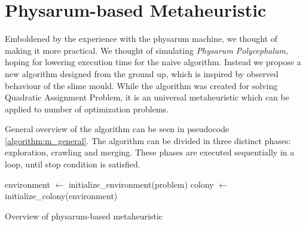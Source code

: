 \section{Physarum-based Metaheuristic}
\label{section:algorithm_metaheuristic}

Emboldened by the experience with the physarum machine, we thought of making it more practical. We thought of simulating \textit{Physarum Polycephalum}, hoping for lowering execution time for the naive algorithm. Instead we propose a new algorithm designed from the ground up, which is inspired by observed behaviour of the slime mould. While the algorithm was created for solving Quadratic Assignment Problem, it is an universal metaheuristic which can be applied to number of optimization problems.

General overview of the algorithm can be seen in pseudocode \ref{algorithm:m_general}. The algorithm can be divided in three distinct phases: exploration, crawling and merging. These phases are executed sequentially in a loop, until stop condition is satisfied.

\begin{algorithm}[H]

  \BlankLine
  environment $\leftarrow$ initialize\_environment(problem)\;
  colony $\leftarrow$ initialize\_colony(environment)\;


  \;

  \caption{Overview of physarum-based metaheuristic}
  \label{algorithm:m_general}
\end{algorithm}
